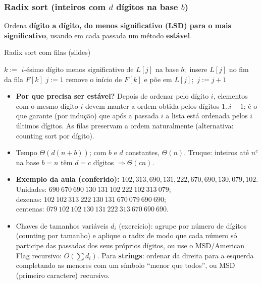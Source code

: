 \subsubsection*{Radix sort (inteiros com $d$ dígitos na base $b$)}
Ordena \textbf{dígito a dígito, do menos significativo (LSD) para o mais significativo}, usando em cada passada um método \textbf{estável}.
\begin{pseudo}{Radix sort com filas (slides)}
\begin{algorithmic}
    \State $k:=$ $i$-ésimo dígito menos significativo de $L[j]$ na base $b$;\ insere $L[j]$ no fim da fila $F[k]$
  \EndFor
  \State $j:=1$
     \State remove o início de $F[k]$ e põe em $L[j]$;\ $j:=j+1$ \EndWhile
  \EndFor
\EndFor
\end{algorithmic}
\end{pseudo}
\begin{itemize}
  \item \textbf{Por que precisa ser estável?} Depois de ordenar pelo dígito $i$, elementos com o mesmo dígito $i$ devem manter a ordem obtida pelos dígitos $1..i-1$; é o que garante (por indução) que após a passada $i$ a lista está ordenada pelos $i$ últimos dígitos. As filas preservam a ordem naturalmente (alternativa: counting sort por dígito).
  \item Tempo $\Theta(d(n+b))$; com $b$ e $d$ constantes, $\Theta(n)$. Truque: inteiros até $n^c$ na base $b=n$ têm $d=c$ dígitos $\Rightarrow\Theta(cn)$.
  \item \textbf{Exemplo da aula (conferido):} $102,313,690,131,222,670,690,130,079,102$.\\
  Unidades: $690\ 670\ 690\ 130\ 131\ 102\ 222\ 102\ 313\ 079$;\\
  dezenas: $102\ 102\ 313\ 222\ 130\ 131\ 670\ 079\ 690\ 690$;\\
  centenas: $079\ 102\ 102\ 130\ 131\ 222\ 313\ 670\ 690\ 690$.
  \item Chaves de tamanhos variáveis $d_i$ (exercício): agrupe por número de dígitos (counting por tamanho) e aplique o radix de modo que cada número só participe das passadas dos seus próprios dígitos, ou use o MSD/American Flag recursivo: $O(\sum d_i)$. Para \textbf{strings}: ordenar da direita para a esquerda completando as menores com um símbolo ``menor que todos'', ou MSD (primeiro caractere) recursivo.
\end{itemize}

